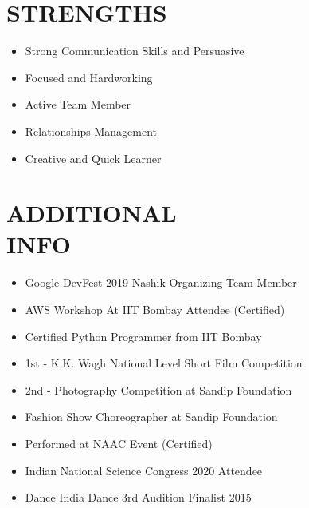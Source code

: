 \documentclass[margin, 12pt]{res} %
\begin{document}
\begin{resume}

\section{STRENGTHS}
\begin{itemize}
\item Strong Communication Skills and Persuasive
\item Focused and Hardworking
\item Active Team Member
\item Relationships Management
\item Creative and Quick Learner
\end{itemize}


\section{ADDITIONAL\\INFO} 
\begin{itemize}
\item Google DevFest 2019 Nashik Organizing Team Member 
\item AWS Workshop At IIT Bombay Attendee (Certified)
\item Certified Python Programmer from IIT Bombay
\item 1st - K.K. Wagh National Level Short Film Competition
\item 2nd - Photography Competition at Sandip Foundation
\item Fashion Show Choreographer at Sandip Foundation 
\item Performed at NAAC Event (Certified) 
\item Indian National Science Congress 2020 Attendee
\item Dance India Dance 3rd Audition Finalist 2015
\end{itemize}



\end{resume}
\end{document}
